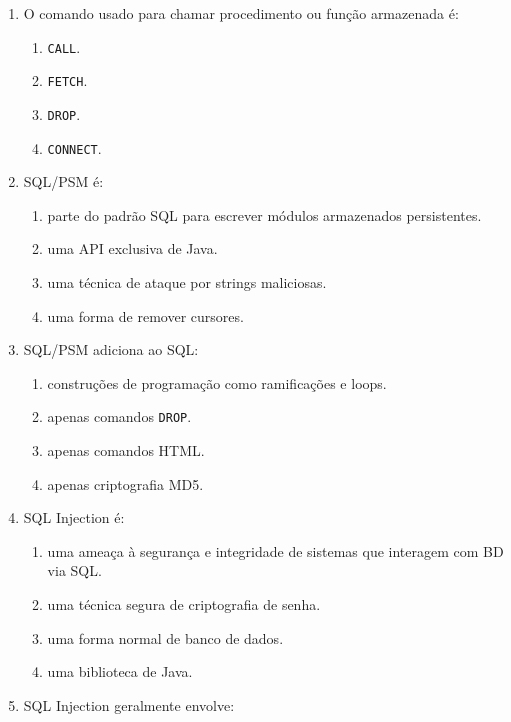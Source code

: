 \documentclass[12pt,a4paper]{article}
\begin{document}
\begin{enumerate}[label=\textbf{Q\arabic*.}]
\item O comando usado para chamar procedimento ou função armazenada é:

\begin{enumerate}[label=\alph*)]
    \item \texttt{CALL}.
    \item \texttt{FETCH}.
    \item \texttt{DROP}.
    \item \texttt{CONNECT}.
\end{enumerate}

\item SQL/PSM é:

\begin{enumerate}[label=\alph*)]
    \item parte do padrão SQL para escrever módulos armazenados persistentes.
    \item uma API exclusiva de Java.
    \item uma técnica de ataque por strings maliciosas.
    \item uma forma de remover cursores.
\end{enumerate}

\item SQL/PSM adiciona ao SQL:

\begin{enumerate}[label=\alph*)]
    \item construções de programação como ramificações e loops.
    \item apenas comandos \texttt{DROP}.
    \item apenas comandos HTML.
    \item apenas criptografia MD5.
\end{enumerate}

\item SQL Injection é:

\begin{enumerate}[label=\alph*)]
    \item uma ameaça à segurança e integridade de sistemas que interagem com BD via SQL.
    \item uma técnica segura de criptografia de senha.
    \item uma forma normal de banco de dados.
    \item uma biblioteca de Java.
\end{enumerate}

\item SQL Injection geralmente envolve:


\end{enumerate}
\end{document}
